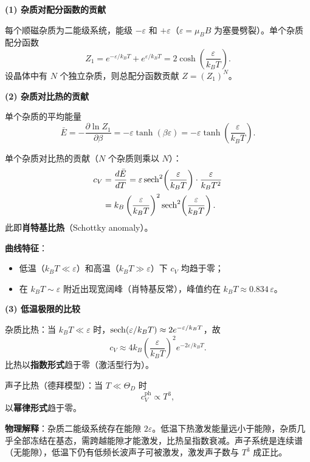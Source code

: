 \begin{derivationbox}[标准解题过程]
\textbf{(1) 杂质对配分函数的贡献}

每个顺磁杂质为二能级系统，能级 $-\varepsilon$ 和 $+\varepsilon$（$\varepsilon=\mu_BB$ 为塞曼劈裂）。单个杂质配分函数
\begin{equation}
Z_1=e^{-\varepsilon/k_BT}+e^{\varepsilon/k_BT}=2\cosh\!\left(\frac{\varepsilon}{k_BT}\right).
\end{equation}
设晶体中有 $N$ 个独立杂质，则总配分函数贡献 $Z=(Z_1)^N$。

\textbf{(2) 杂质对比热的贡献}

单个杂质的平均能量
\begin{equation}
\bar{E}=-\frac{\partial\ln Z_1}{\partial\beta}=-\varepsilon\tanh(\beta\varepsilon)=-\varepsilon\tanh\!\left(\frac{\varepsilon}{k_BT}\right).
\end{equation}

单个杂质对比热的贡献（$N$ 个杂质则乘以 $N$）：
\begin{align}
c_V&=\frac{d\bar{E}}{dT}
=\varepsilon\sech^2\!\left(\frac{\varepsilon}{k_BT}\right)\cdot\frac{\varepsilon}{k_BT^2}\\
&=k_B\left(\frac{\varepsilon}{k_BT}\right)^2\sech^2\!\left(\frac{\varepsilon}{k_BT}\right).
\end{align}
此即\textbf{肖特基比热}（Schottky anomaly）。

\textbf{曲线特征}：
\begin{itemize}
    \item 低温（$k_BT\ll\varepsilon$）和高温（$k_BT\gg\varepsilon$）下 $c_V$ 均趋于零；
    \item 在 $k_BT\sim\varepsilon$ 附近出现宽阔峰（肖特基反常），峰值约在 $k_BT\approx0.834\,\varepsilon$。
\end{itemize}

\textbf{(3) 低温极限的比较}

杂质比热：当 $k_BT\ll\varepsilon$ 时，$\sech(\varepsilon/k_BT)\approx2e^{-\varepsilon/k_BT}$，故
\begin{equation}
c_V\approx4k_B\left(\frac{\varepsilon}{k_BT}\right)^2e^{-2\varepsilon/k_BT}.
\end{equation}
比热以\textbf{指数形式}趋于零（激活型行为）。

声子比热（德拜模型）：当 $T\ll\Theta_D$ 时
\begin{equation}
c_V^{\text{ph}}\propto T^3,
\end{equation}
以\textbf{幂律形式}趋于零。

\textbf{物理解释}：杂质二能级系统存在能隙 $2\varepsilon$。低温下热激发能量远小于能隙，杂质几乎全部冻结在基态，需跨越能隙才能激发，比热呈指数衰减。声子系统是连续谱（无能隙），低温下仍有低频长波声子可被激发，激发声子数与 $T^3$ 成正比。


\end{derivationbox}
